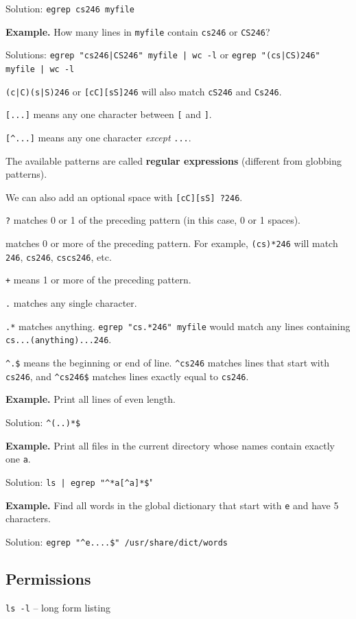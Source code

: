 \documentclass[11pt]{article}
\theoremstyle{definition}
\begin{document}
Solution: {\tt egrep cs246 myfile}

{\bf Example.} How many lines in {\tt myfile} contain {\tt cs246} or {\tt CS246}?

Solutions: 
{\tt egrep "cs246|CS246" myfile | wc -l} or {\tt egrep "(cs|CS)246" myfile | wc -l}

{\tt (c|C)(s|S)246} or {\tt [cC][sS]246} will also match {\tt cS246} and {\tt Cs246}. 

{\tt [...]} means any one character between {\tt [} and {\tt ]}.

{\tt [\^ \null ...]} means any one character {\it except} {\tt ...}.

The available patterns are called {\bf regular expressions} (different from globbing patterns). 

We can also add an optional space with {\tt [cC][sS] ?246}. 

{\tt ?} matches 0 or 1 of the preceding pattern (in this case, 0 or 1 spaces).

{\tt *} matches 0 or more of the preceding pattern. For example, {\tt (cs)*246} will match {\tt 246}, {\tt cs246}, {\tt cscs246}, etc.

{\tt +} means 1 or more of the preceding pattern.

{\tt .} matches any single character.

{\tt .*} matches anything. {\tt egrep "cs.*246" myfile} would match any lines containing {\tt cs...(anything)...246}.

{\tt \^\null.\$} means the beginning or end of line. {\tt \^\null cs246} matches lines that start with {\tt cs246}, and {\tt \^\null cs246\$} matches lines exactly equal to {\tt cs246}.

{\bf Example.} Print all lines of even length.

Solution: {\tt \^\null(..)*\$}

{\bf Example.} Print all files in the current directory whose names contain exactly one {\tt a}.

Solution: {\tt ls | egrep "\^\null[\^\null a]*a[\^\null a]*\$}"

{\bf Example.} Find all words in the global dictionary that start with {\tt e} and have 5 characters.

Solution: {\tt egrep "\^\null e....\$" /usr/share/dict/words}

\subsection{Permissions}
{\tt ls -l} -- long form listing
\end{document}
